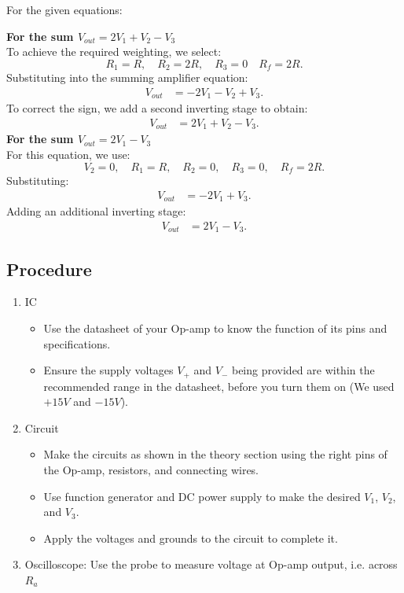 \documentclass[a4paper,12pt]{article}
\begin{document}
For the given equations:

\textbf{For the sum \( V_{out} = 2V_1 + V_2 - V_3 \)}\\
To achieve the required weighting, we select:
\begin{equation}
    R_1 = R, \quad R_2 = 2R, \quad R_3 = 0 \quad R_f = 2R.
\end{equation}
Substituting into the summing amplifier equation:
\begin{align*}
    V_{out} &= -2V_1 - V_2 + V_3.
\end{align*}
To correct the sign, we add a second inverting stage to obtain:
\begin{align*}
    V_{out} &= 2V_1 + V_2 - V_3.
\end{align*}
\textbf{For the sum \( V_{out} = 2V_1 - V_3 \)}\\
For this equation, we use:
\begin{equation}
    V_2 = 0,\quad R_1 = R,\quad R_2 = 0,\quad R_3 = 0, \quad R_f = 2R.
\end{equation}
Substituting:
\begin{align*}
    V_{out} &= -2V_1 + V_3.
\end{align*}
Adding an additional inverting stage:
\begin{align*}
    V_{out} &= 2V_1 - V_3.
\end{align*}

\subsection{Procedure}
\begin{enumerate}
	\item IC
		\begin{itemize}
			\item Use the datasheet of your Op-amp to know the function of its pins and specifications.
			\item Ensure the supply voltages $V_+$ and $V_-$ being provided are within the recommended range in the datasheet, before you turn them on (We used $+15V$ and $-15V$).
		\end{itemize}
	\item Circuit
		\begin{itemize}
			\item Make the circuits as shown in the theory section using the right pins of the Op-amp, resistors, and connecting wires.
			\item Use function generator and DC power supply to make the desired $V_1$, $V_2$, and $V_3$.
			\item Apply the voltages and grounds to the circuit to complete it.
		\end{itemize}
	\item Oscilloscope: Use the probe to measure voltage at Op-amp output, i.e. across $R_a$
\end{enumerate}
\end{document}
